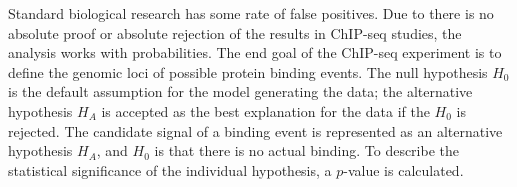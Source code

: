 







Standard biological research has some rate of false positives. 
Due to there is no absolute proof or absolute rejection of the results in ChIP-seq studies, the analysis works with probabilities.
The end goal of the ChIP-seq experiment is to define the genomic loci of possible protein binding events. 
The null hypothesis $H_{0}$ is the default assumption for the model generating the data; the alternative hypothesis $H_{A}$ is accepted as the best explanation for the data if the $H_{0}$ is rejected.
The candidate signal of a binding event is represented as an alternative hypothesis $H_{A}$, and $H_{0}$ is that there is no actual binding. 
To describe the statistical significance of the individual hypothesis, a $p$-value is calculated.

